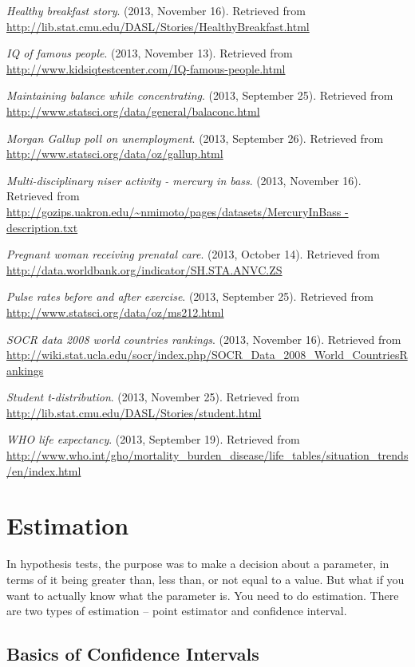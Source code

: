 \documentclass[]{book}
\begin{document}
\emph{Healthy breakfast story}. (2013, November 16). Retrieved from
\url{http://lib.stat.cmu.edu/DASL/Stories/HealthyBreakfast.html}

\emph{IQ of famous people}. (2013, November 13). Retrieved from
\url{http://www.kidsiqtestcenter.com/IQ-famous-people.html}

\emph{Maintaining balance while concentrating}. (2013, September 25).
Retrieved from \url{http://www.statsci.org/data/general/balaconc.html}

\emph{Morgan Gallup poll on unemployment}. (2013, September 26). Retrieved
from \url{http://www.statsci.org/data/oz/gallup.html}

\emph{Multi-disciplinary niser activity - mercury in bass}. (2013, November
16). Retrieved from
\href{http://gozips.uakron.edu/~nmimoto/pages/datasets/MercuryInBass\%20-\%20description.txt}{http://gozips.uakron.edu/\textasciitilde{}nmimoto/pages/datasets/MercuryInBass -
description.txt}

\emph{Pregnant woman receiving prenatal care}. (2013, October 14). Retrieved
from \url{http://data.worldbank.org/indicator/SH.STA.ANVC.ZS}

\emph{Pulse rates before and after exercise}. (2013, September 25). Retrieved
from \url{http://www.statsci.org/data/oz/ms212.html}

\emph{SOCR data 2008 world countries rankings}. (2013, November 16).
Retrieved from
\url{http://wiki.stat.ucla.edu/socr/index.php/SOCR_Data_2008_World_CountriesRankings}

\emph{Student t-distribution}. (2013, November 25). Retrieved from
\url{http://lib.stat.cmu.edu/DASL/Stories/student.html}

\emph{WHO life expectancy}. (2013, September 19). Retrieved from
\url{http://www.who.int/gho/mortality_burden_disease/life_tables/situation_trends/en/index.html}

\hypertarget{estimation}{%
\chapter{Estimation}\label{estimation}}

In hypothesis tests, the purpose was to make a decision about a parameter, in terms of it being greater than, less than, or not equal to a value. But what if you want to actually know what the parameter is. You need to do estimation. There are two types of estimation -- point estimator and confidence interval.

\hypertarget{basics-of-confidence-intervals}{%
\section{Basics of Confidence Intervals}\label{basics-of-confidence-intervals}}
\end{document}

